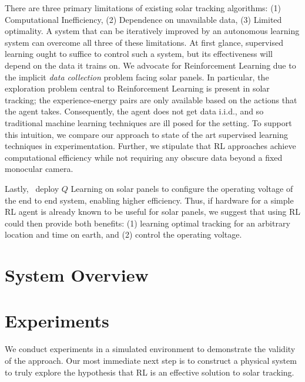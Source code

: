 \documentclass[11pt]{article}
\begin{document}
There are three primary limitations of existing solar tracking algorithms: (1) Computational Inefficiency, (2) Dependence on unavailable data, (3) Limited optimality. A system that can be iteratively improved by an autonomous learning system can overcome all three of these limitations. At first glance, supervised learning ought to suffice to control such a system, but its effectiveness will depend on the data it trains on. We advocate for Reinforcement Learning due to the implicit {\it data collection} problem facing solar panels. In particular, the exploration problem central to Reinforcement Learning is present in solar tracking; the experience-energy pairs are only available based on the actions that the agent takes. Consequently, the agent does not get data i.i.d., and so traditional machine learning techniques are ill posed for the setting. To support this intuition, we compare our approach to state of the art supervised learning techniques in experimentation. Further, we stipulate that RL approaches achieve computational efficiency while not requiring any obscure data beyond a fixed monocular camera.

Lastly,~\citet{Hsu2015} deploy $Q$ Learning on solar panels to configure the operating voltage of the end to end system, enabling higher efficiency. Thus, if hardware for a simple RL agent is already known to be useful for solar panels, we suggest that using RL could then provide both benefits: (1) learning optimal tracking for an arbitrary location and time on earth, and (2) control the operating voltage. \\



\section{System Overview}



\section{Experiments}

We conduct experiments in a simulated environment to demonstrate the validity of the approach. Our most immediate next step is to construct a physical system to truly explore the hypothesis that RL is an effective solution to solar tracking. \\
\end{document}
